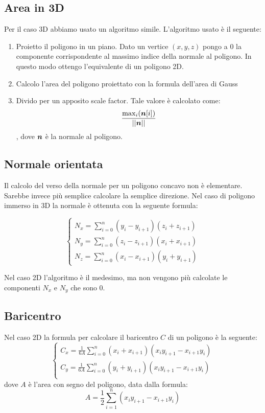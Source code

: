 \documentclass[oneside,12pt]{book}  %
\theoremstyle{plain}
\theoremstyle{definition}
\theoremstyle{remark}
\numberwithin{equation}{chapter} %
\begin{document}

\subsection{Area in 3D}
Per il caso 3D abbiamo usato un algoritmo simile. L'algoritmo usato
\`e il seguente:
\begin{enumerate}
\item Proietto il poligono in un piano. 
Dato un vertice $(x,y,z)$ pongo a 0 la componente corrispondente al
massimo indice della normale al poligono. In questo modo ottengo
l'equivalente di un poligono 2D.

\item Calcolo l'area del poligono proiettato con la formula dell'area
  di Gauss

\item Divido per un apposito scale factor. Tale valore \`e calcolato
  come:
$$ \frac{\max_i ({\mbox{\boldmath$n$}}[i])}{||{\mbox{\boldmath$n$}}||} $$,
dove ${\mbox{\boldmath$n$}}$ \`e la normale al poligono.

\end{enumerate}

\subsection{Normale orientata}
Il calcolo del verso della normale per un poligono concavo non \`e
elementare. Sarebbe invece pi\`u semplice calcolare la semplice
direzione.
Nel caso di poligono immerso in 3D la normale \`e ottenuta con la
seguente formula:

$$
\begin{cases}
N_x=\sum_{i=0}^{n} (y_i-y_{i+1})(z_i+z_{i+1}) \\
N_y=\sum_{i=0}^{n} (z_i-z_{i+1})(x_i+x_{i+1}) \\
N_z=\sum_{i=0}^{n} (x_i-x_{i+1})(y_i+y_{i+1}) 
\end{cases}
$$

Nel caso 2D l'algoritmo \`e il medesimo, ma non vengono pi\`u
calcolate le componenti $N_x$ e $N_y$ che sono 0.

\subsection{Baricentro}
Nel caso 2D la formula per calcolare il baricentro $C$ di un poligono
\`e la seguente:
$$
\begin{cases}
C_x=\frac{1}{6A}\sum_{i=0}^{n} (x_i+x_{i+1})(x_iy_{i+1}-x_{i+1}y_i) \\
C_y=\frac{1}{6A}\sum_{i=0}^{n} (y_i+y_{i+1})(x_iy_{i+1}-x_{i+1}y_i) \\
\end{cases}
$$
dove $A$ \`e l'area con segno del poligono, data dalla formula:
$$A=\frac{1}{2} \sum_{i=1}^n (x_iy_{i+1}-x_{i+1}y_i) $$
\end{document}

